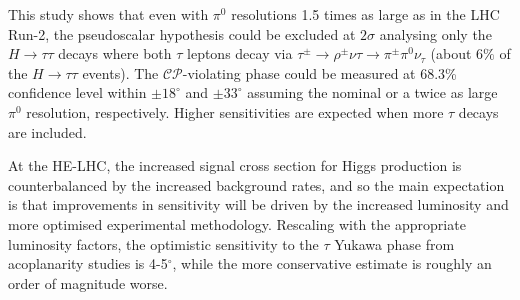 \documentclass[../report.tex]{subfiles}
\begin{document}
This study shows that even with $\pi^{0}$ resolutions 1.5 times as large as in the LHC Run-2, the pseudoscalar hypothesis could be excluded at $2\sigma$ analysing only the $H\to\tau\tau$ decays where both $\tau$ leptons decay via $\tau^{\pm}\to\rho^{\pm}\nu\tau\to\pi^{\pm}\pi^0\nu_\tau$ (about $6\%$ of the $H\to\tau\tau$ events). The $\mathcal{CP}$-violating phase could be measured at 68.3\% confidence level within $\pm 18^{\circ}$ and $\pm 33^{\circ}$ assuming the nominal or a twice as large $\pi^{0}$ resolution, respectively. Higher sensitivities are expected when more $\tau$ decays are included.

At the HE-LHC, the increased signal cross section for Higgs production
is counterbalanced by the increased background rates, and so the main
expectation is that improvements in sensitivity will be driven by the
increased luminosity and more optimised experimental methodology.
Rescaling with the appropriate luminosity factors, the optimistic
sensitivity to the $\tau$ Yukawa phase from acoplanarity studies is
4-5$^\circ$, while the more conservative estimate is roughly an order
of magnitude worse.
\end{document}
